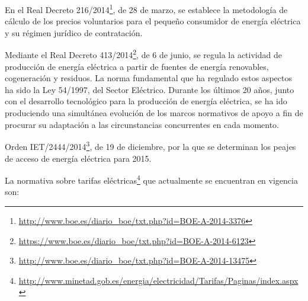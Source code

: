 En el Real
Decreto 216/2014\footnote{\url{http://www.boe.es/diario_boe/txt.php?id=BOE-A-2014-3376}}, de 28 de marzo, se establece la metodología de
cálculo de los precios voluntarios para el pequeño consumidor de energía
eléctrica y su régimen jurídico de contratación.

Mediante el Real Decreto 413/2014\footnote{\url{https://www.boe.es/diario_boe/txt.php?id=BOE-A-2014-6123}}, de 6 de junio, se regula la actividad de producción
de energía eléctrica a partir de fuentes de energía renovables,
cogeneración y residuos. La norma fundamental que ha regulado estos
aspectos ha sido la Ley 54/1997, del Sector Eléctrico. Durante los
últimos 20 años, junto con el desarrollo tecnológico para la producción
de energía eléctrica, se ha ido produciendo una simultánea evolución de
los marcos normativos de apoyo a fin de procurar su adaptación a las
circunstancias concurrentes en cada momento.

Orden
IET/2444/2014\footnote{\url{http://www.boe.es/diario_boe/txt.php?id=BOE-A-2014-13475}}, de 19 de diciembre, por la que se determinan los peajes
de acceso de energía eléctrica para 2015.

La normativa sobre tarifas
eléctricas\footnote{\url{http://www.minetad.gob.es/energia/electricidad/Tarifas/Paginas/index.aspx}} que actualmente se encuentran en vigencia son:

